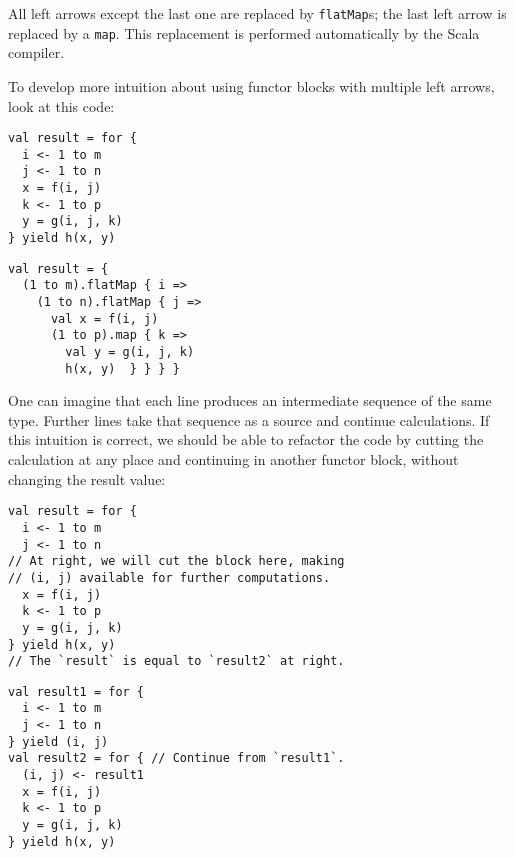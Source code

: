 \vspace{0.2\baselineskip}
All left arrows except the last one are replaced by \lstinline!flatMap!s;
the last left arrow is replaced by a \lstinline!map!. This replacement
is performed automatically by the Scala compiler.

To develop more intuition about using functor blocks with multiple
left arrows, look at this code:

\noindent \texttt{\textcolor{blue}{\footnotesize{}}}%
\begin{minipage}[c]{0.475\columnwidth}%
\texttt{\textcolor{blue}{\footnotesize{}}}
\begin{lstlisting}
val result = for {
  i <- 1 to m
  j <- 1 to n
  x = f(i, j)
  k <- 1 to p
  y = g(i, j, k)
} yield h(x, y)
\end{lstlisting}
%
\end{minipage}\texttt{\textcolor{blue}{\footnotesize{}\hspace*{\fill}}}%
\begin{minipage}[c]{0.475\columnwidth}%
\texttt{\textcolor{blue}{\footnotesize{}}}
\begin{lstlisting}
val result = {
  (1 to m).flatMap { i =>
    (1 to n).flatMap { j =>
      val x = f(i, j)
      (1 to p).map { k =>
        val y = g(i, j, k)
        h(x, y)  } } } }
\end{lstlisting}
%
\end{minipage}{\footnotesize\par}

\vspace{0.2\baselineskip}
One can imagine that each line produces an intermediate sequence of
the same type. Further lines take that sequence as a source and continue
calculations. If this intuition is correct, we should be able to refactor
the code by cutting the calculation at any place and continuing in
another functor block, without changing the result value:

\noindent \texttt{\textcolor{blue}{\footnotesize{}}}%
\begin{minipage}[c]{0.475\columnwidth}%
\texttt{\textcolor{blue}{\footnotesize{}}}
\begin{lstlisting}
val result = for {
  i <- 1 to m
  j <- 1 to n
// At right, we will cut the block here, making
// (i, j) available for further computations.
  x = f(i, j)
  k <- 1 to p
  y = g(i, j, k)
} yield h(x, y)
// The `result` is equal to `result2` at right.
\end{lstlisting}
%
\end{minipage}\texttt{\textcolor{blue}{\footnotesize{}\hspace*{\fill}}}%
\begin{minipage}[c]{0.475\columnwidth}%
\texttt{\textcolor{blue}{\footnotesize{}}}
\begin{lstlisting}
val result1 = for {
  i <- 1 to m
  j <- 1 to n
} yield (i, j)
val result2 = for { // Continue from `result1`.
  (i, j) <- result1
  x = f(i, j)
  k <- 1 to p
  y = g(i, j, k)
} yield h(x, y)
\end{lstlisting}
%
\end{minipage}{\footnotesize\par}

